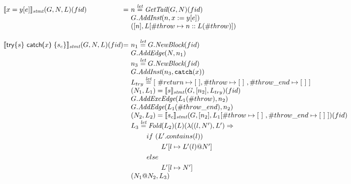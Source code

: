 \[\begin{array}{l@{}l@{~}l}
\transfun{\irload{x}{y}{e}}_{\emph{stmt}}(G,N,L)(fid) & = &
	n \letval \GetTail(G,N)(fid)\\
	& & G.\emph{AddInst}(n,x := y[e])\\
	& & ([n],L[\#throw \mapsto n::L(\#throw)])\\
	& & \\

\transfun{\ircfgtrycat{s}{x}{s_c}}_{\emph{stmt}}(G,N,L)(fid) & = &
	n_1 \letval G.\emph{NewBlock}(fid)\\
	& & G.\emph{AddEdge}(N,n_1)\\
	& & n_3 \letval G.\emph{NewBlock}(fid)\\
	& & G.\emph{AddInst}(n_3,\TT{catch}(x))\\
	& & L_{try} \letval [\ \#return \mapsto [\ ], \#throw \mapsto [\ ]\ , \#throw\_end \mapsto [\ ]\ ] \\
	& & (N_1,L_1) = \transfun{s}_{\emph{stmt}}(G,[n_2],L_{try})(fid)\\
	& & G.\emph{AddExcEdge}(L_1(\#throw),n_2)\\
	& & G.\emph{AddEdge}(L_1(\#throw\_end),n_2)\\
	& & (N_2,L_2) = \transfun{s_c}_{\emph{stmt}}(G,[n_2],L_1[\#throw \mapsto [\ ]\ ,\#throw\_end \mapsto [\ ]\ ])(fid)\\
	& & L_3 \letval \Fold(L_2)(L)(\lambda((l,N'),L') \Rightarrow\\
	& & \phantom{L_3 \letval}if\ (L'.contains(l))\\
	& & \phantom{L_3 \letval \Fold} L'[l \mapsto L'(l)@N']\\
	& & \phantom{L_3 \letval}else\\
	& & \phantom{L_3 \letval \Fold} L'[l \mapsto N']\\
	& & (N_1@N_2, L_3)\\
	& & \\ 
	

\end{array}\]
